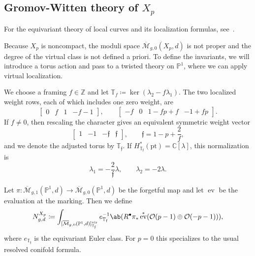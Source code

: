 \documentclass{amsart}
\theoremstyle{definition}
\theoremstyle{remark}
\theoremstyle{plain}
\theoremstyle{definition}
\theoremstyle{remark}
\newcommand{\C}{\mathbb{C}}
\newcommand{\Z}{\mathbb{Z}}
\renewcommand{\P}{\mathbb{P}}
\newcommand{\Mbar}{\overline{\mathcal{M}}}
\newcommand{\mc}[1]{\mathcal{#1}}
\newcommand{\T}{\mathbb{T}}
\newcommand{\mf}[1]{\mathfrak{#1}}
\newcommand{\mr}[1]{\mathrm{#1}}
\newcommand{\1}{\mathbf{1}}
\newcommand{\2}{\mathbf{2}}
\newcommand{\3}{\mathbf{3}}
\newcommand{\vir}{\mr{vir}}
\DeclareMathOperator{\ev}{ev}
\begin{document}
\subsection{Gromov-Witten theory of \(X_p\)}%
\label{sub:Gromov-Witten theory of Xp}

For the equivariant theory of local curves and its localization formulas, see~\cite{BryanPandharipande2008}.

Because \(X_p\) is noncompact, the moduli space \(\Mbar_{g,0}(X_p,d)\) is not proper and the degree of the virtual class is not defined a priori. To define the invariants, we will introduce a torus action and pass to a twisted theory on \(\P^1\), where we can apply virtual localization.

We choose a framing \(f \in \Z\) and let \(\T_f \coloneqq \ker(\lambda_2 - f\lambda_1)\). The two localized weight rows, each of which includes one zero weight, are
\[ \begin{bmatrix} 0 & f & 1 & -f-1 \end{bmatrix}, \qquad \begin{bmatrix} -f & 0 & 1-fp+f & -1+fp \end{bmatrix}. \]
If \(f \neq 0\), then rescaling the character gives an equivalent symmetric weight vector
\[ \begin{bmatrix} 1 & -1 & -\mf{f} & \mf{f} \end{bmatrix}, \qquad \mf{f} = 1-p+\frac{2}{f}, \]
and we denote the adjusted torus by \(\T_{\mf{f}}\). If \(H^*_{\T_{\mf{f}}}(\mr{pt}) = \C[\lambda]\), this normalization is
\[ \lambda_1 = -\frac{2}{\mf{f}}\lambda, \qquad \lambda_2 = -2\lambda. \]

Let \(\pi \colon \Mbar_{g,1}(\P^1,d) \to \Mbar_{g,0}(\P^1,d)\) be the forgetful map and let \(\ev\) be the evaluation at the marking. Then we define
\[ N^{X_p}_{g,d} \coloneqq \int_{[\Mbar_{g,0}(\P^1,d)]^{\vir}_{\T_{\mf{f}}}} e_{\T_{\mf{f}}}^{-1}\ab(R^{\bullet}\pi_* \ev^*(\mc{O}(p-1)\oplus\mc{O}(-p-1))), \]
where \(e_{\T_{\mf{f}}}\) is the equivariant Euler class. For \(p=0\) this specializes to the usual resolved conifold formula.
\end{document}
